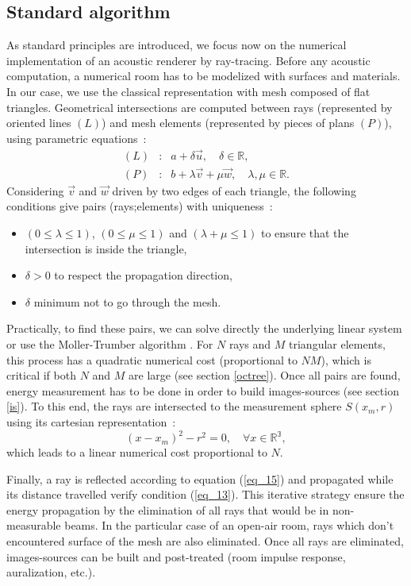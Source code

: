 \documentclass{aes2e}
\begin{document}
\subsection{Standard algorithm}
As standard principles are introduced, we focus now on the numerical implementation of an acoustic renderer by ray-tracing. Before any acoustic computation, a numerical room has to be modelized with surfaces and materials. In our case, we use the classical representation with mesh composed of flat triangles. Geometrical intersections are computed between rays (represented by oriented lines $(L)$) and mesh elements (represented by pieces of plans $(P)$), using parametric equations~:
\begin{eqnarray}
(L) &:& a + \delta \overrightarrow{u}, \quad \delta \in \mathbb{R},  \\
(P) &:& b + \lambda \overrightarrow{v} + \mu \overrightarrow{w}, \quad \lambda, \mu \in \mathbb{R}.
\label{eq_20}
\end{eqnarray}    
Considering $\overrightarrow{v}$ and $\overrightarrow{w}$ driven by two edges of each triangle, the following conditions give pairs (rays;elements)  with uniqueness~: 
\begin{itemize}
\item $(0 \leq \lambda \leq 1)$, $(0 \leq \mu \leq 1)$  and $(\lambda+\mu \leq 1)$ to ensure that the intersection is inside the triangle,
\item $\delta > 0$ to respect the propagation direction,
\item $\delta$ minimum not to go through the mesh.
\end{itemize}
Practically, to find these pairs, we can solve directly the underlying linear system or use the Moller-Trumber algorithm \cite{moller}. For $N$ rays and $M$ triangular elements, this process has a quadratic numerical cost (proportional to $NM$), which is critical if both $N$ and $M$ are large (see section \ref{octree}). Once all pairs are found, energy measurement has to be done in order to build images-sources (see section \ref{is}). To this end, the rays are intersected to the measurement sphere $S(x_m, r)$ using its cartesian representation~:
\begin{equation}
(x-x_m)^2 - r^2 = 0, \quad \forall x \in  \mathbb{R^3},
\end{equation} 
which leads to a linear numerical cost proportional to $N$.


Finally, a ray is reflected according to equation (\ref{eq_15}) and propagated while its distance travelled verify condition (\ref{eq_13}). This iterative strategy ensure the energy propagation by the elimination of all rays that would be in non-measurable beams. In the particular case of an open-air room, rays which don't encountered surface of the mesh are also eliminated. Once all rays are eliminated, images-sources can be built and post-treated (room impulse response, auralization, etc.).
\end{document}
